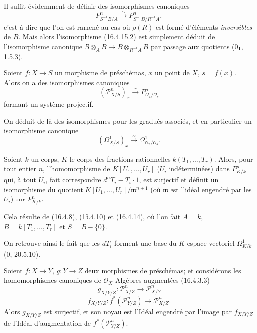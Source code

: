 Il suffit évidemment de définir des isomorphismes canoniques
\[
  P_{S^{-1}B/A}^n\xrightarrow{\sim}P_{S^{-1}B/R^{-1}A}^n,
  \tag{16.4.15.2}
  \label{IV.16.4.15.2}
\]
c'est-à-dire que l'on est ramené au cas où $\rho(R)$ est formé d'éléments
\emph{inversibles} de $B$. Mais alors l'isomorphisme (16.4.15.2) est simplement
déduit de l'isomorphisme canonique
$B\otimes_A B\to B\otimes_{R^{-1}A}B$ par passage aux quotients
(0$_{\rm I}$, 1.5.3).

\begin{corollary}[16.4.16]
\label{IV.16.4.16}
Soient $f:X\to S$ un morphisme de préschémas, $x$ un point de $X$,
$s=f(x)$. Alors on a des isomorphismes canoniques
\[
  (\mathscr{P}_{X/S}^n)_x\xrightarrow{\sim}
  P_{\mathcal{O}_x/\mathcal{O}_s}^n
  \tag{16.4.16.1}
  \label{IV.16.4.16.1}
\]
formant un système projectif.
\end{corollary}

On déduit de là des isomorphismes pour les gradués associés, et en particulier
un isomorphisme canonique
\[
  (\Omega_{X/S}^1)_x\xrightarrow{\sim}
  \Omega_{\mathcal{O}_x/\mathcal{O}_s}^1.
  \tag{16.4.16.2}
  \label{IV.16.4.16.2}
\]

\begin{corollary}[16.4.17]
\label{IV.16.4.17}
Soient $k$ un corps, $K$ le corps des fractions rationnelles
$k(T_1,\ldots,T_r)$. Alors, pour tout entier $n$, l'homomorphisme de
$K[U_1,\ldots,U_r]$ ($U_i$ indéterminées) dans $P_{K/k}^n$ qui, à tout $U_i$,
fait correspondre $d^nT_i-T_i\cdot1$, est surjectif et définit un isomorphisme
du quotient $K[U_1,\ldots,U_r]/\mathfrak{m}^{n+1}$ (où $\mathfrak{m}$ est
l'idéal engendré par les $U_i$) sur $P_{K/k}^n$.
\end{corollary}

Cela résulte de (16.4.8), (16.4.10) et (16.4.14), où l'on fait $A=k$,
$B=k[T_1,\ldots,T_r]$ et $S=B-\{0\}$.

On retrouve ainsi le fait que les $dT_i$ forment une base du $K$-espace
vectoriel $\Omega_{K/k}^1$ (0, 20.5.10).

\begin{proposition}[16.4.18]
\label{IV.16.4.18}
Soient $f:X\to Y$, $g:Y\to Z$ deux morphismes de préschémas; et considérons
les homomorphismes canoniques de $\mathcal{O}_X$-Algèbres augmentées
(16.4.3.3)
\[
  g_{X/Y/Z}:\mathscr{P}_{X/Z}^n\longrightarrow\mathscr{P}_{X/Y}^n
  \tag{16.4.18.1}
  \label{IV.16.4.18.1}
\]
\[
  f_{X/Y/Z}:f^*(\mathscr{P}_{Y/Z}^n)
  \longrightarrow\mathscr{P}_{X/Z}^n.
  \tag{16.4.18.2}
  \label{IV.16.4.18.2}
\]
Alors $g_{X/Y/Z}$ est surjectif, et son noyau est l'Idéal engendré par l'image
par $f_{X/Y/Z}$ de l'Idéal d'augmentation de
$f^*(\mathscr{P}_{Y/Z}^n)$.
\end{proposition}

